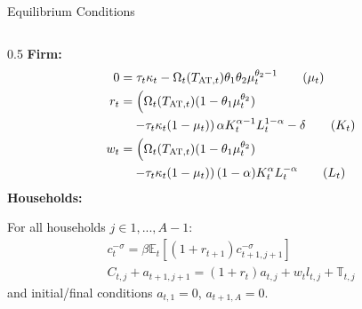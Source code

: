 \documentclass[aspectratio=1610]{beamer}
\begin{document}
\begin{frame}[fragile]{Equilibrium Conditions}
\begin{small}
  \begin{columns}
        \begin{column}{0.5\textwidth}
        \textbf{Firm:}
            \begin{align}
                0 & = \tau_t \kappa_t  - \Omega_t (T_{\mathrm{AT}, t}) \theta_1 \theta_2 \mu_t^{\theta_2 -1} \tag{$\mu_t$}\\
                r_t & = \left( \Omega_t (T_{\mathrm{AT}, t}) (1 - \theta_1 \mu_t^{\theta_2}) \right. \notag \\
                    & \quad \left. - \tau_t \kappa_t (1 - \mu_t) \right) \alpha K_t^{\alpha - 1} L_t^{1 - \alpha} - \delta \tag{$K_t$}\\
                w_t & = \left( \Omega_t (T_{\mathrm{AT}, t}) (1 - \theta_1 \mu_t^{\theta_2}) \right. \notag\\
                    & \quad \left. - \tau_t \kappa_t (1 - \mu_t) \right) (1 - \alpha) K_t^{\alpha} L_t^{-\alpha} \tag{$L_t$}
            \end{align}
            \textbf{Households:}
            
            For all households $j \in 1,...,A-1$:
            \begin{align}
                c_t^{-\sigma}  = \beta \mathbb{E}_t \left[ (1+ r_{t+1}) c_{t+1,j+1}^{-\sigma} \right] \tag{EE} \\
                C_{t,j} + a_{t+1, j+1}  =  (1 + r_t) a_{t,j} + w_{t} l_{t,j} + \mathbb{T}_{t,j}  \tag{BC}
            \end{align}
            and initial/final conditions $a_{t,1} = 0$, $a_{t+1,A} = 0$.
        \end{column}
    

\end{columns}
\end{small}
\end{frame}
\end{document}
